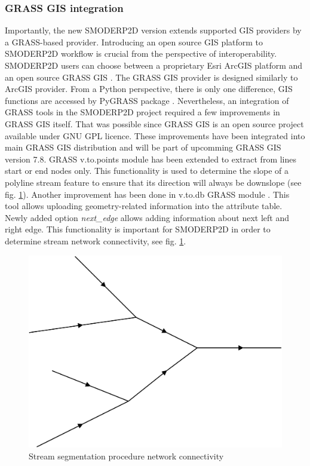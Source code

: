 \subsubsection{GRASS GIS integration}\label{sec:grass_provider}
Importantly, the new SMODERP2D version extends supported GIS providers
by a GRASS-based provider. Introducing an open source GIS platform to
SMODERP2D workflow is crucial from the perspective of
interoperability. SMODERP2D users can choose between a proprietary
Esri ArcGIS platform and an open source GRASS GIS
\cite{neteler2012grass}. The GRASS GIS provider is designed similarly
to ArcGIS provider. From a Python perspective, there is only one
difference, GIS functions are accessed by PyGRASS package
\cite{ijgi2010201}. Nevertheless, an integration of GRASS tools in the
SMODERP2D project required a few improvements in GRASS GIS
itself. That was possible since GRASS GIS is an open source project
available under GNU GPL licence. These improvements have been
integrated into main GRASS GIS distribution and will be part of
upcomming GRASS GIS version 7.8.  GRASS v.to.points module
\cite{v-to-points-2019} has been extended to extract from lines start
or end nodes only. This functionality is used to determine the slope
of a polyline stream feature to ensure that its direction will always
be downslope (see fig. \ref{fig:stream_next_edge}). Another
improvement has been done in v.to.db GRASS module
\cite{v-to-db-2019}. This tool allows uploading geometry-related
information into the attribute table. Newly added option {\it
  next\_edge} allows adding information about next left and right
edge. This functionality is important for SMODERP2D in order to
determine stream network connectivity, see
fig. \ref{fig:stream_next_edge}.

\begin{figure}[ht!]
  \begin{center}
    \includegraphics[width=0.6\columnwidth]{figures/stream_next_edge}
    \caption{Stream segmentation procedure network connectivity}
    \label{fig:stream_next_edge}
  \end{center}
\end{figure}

